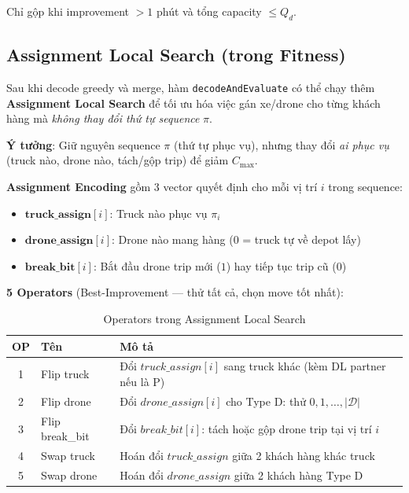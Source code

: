 \documentclass[12pt,a4paper]{article}
\begin{document}
Chỉ gộp khi improvement $> 1$ phút và tổng capacity $\leq Q_d$.

\subsection{Assignment Local Search (trong Fitness)}

Sau khi decode greedy và merge, hàm \texttt{decodeAndEvaluate} có thể chạy thêm \textbf{Assignment Local Search} để tối ưu hóa việc gán xe/drone cho từng khách hàng mà \textit{không thay đổi thứ tự sequence} $\pi$.

\textbf{Ý tưởng}: Giữ nguyên sequence $\pi$ (thứ tự phục vụ), nhưng thay đổi \textit{ai phục vụ} (truck nào, drone nào, tách/gộp trip) để giảm $C_{\max}$.

\textbf{Assignment Encoding} gồm 3 vector quyết định cho mỗi vị trí $i$ trong sequence:
\begin{itemize}[nosep]
    \item $\mathbf{truck\_assign}[i]$: Truck nào phục vụ $\pi_i$
    \item $\mathbf{drone\_assign}[i]$: Drone nào mang hàng ($0$ = truck tự về depot lấy)
    \item $\mathbf{break\_bit}[i]$: Bắt đầu drone trip mới ($1$) hay tiếp tục trip cũ ($0$)
\end{itemize}

\textbf{5 Operators} (Best-Improvement --- thử tất cả, chọn move tốt nhất):

\begin{table}[h!]
\centering
\caption{Operators trong Assignment Local Search}
\begin{tabular}{clp{8cm}}
\toprule
\textbf{OP} & \textbf{Tên} & \textbf{Mô tả} \\
\midrule
1 & Flip truck & Đổi $truck\_assign[i]$ sang truck khác (kèm DL partner nếu là P) \\
2 & Flip drone & Đổi $drone\_assign[i]$ cho Type D: thử $0, 1, \ldots, |\mathcal{D}|$ \\
3 & Flip break\_bit & Đổi $break\_bit[i]$: tách hoặc gộp drone trip tại vị trí $i$ \\
4 & Swap truck & Hoán đổi $truck\_assign$ giữa 2 khách hàng khác truck \\
5 & Swap drone & Hoán đổi $drone\_assign$ giữa 2 khách hàng Type D \\
\bottomrule
\end{tabular}
\end{table}
\end{document}
